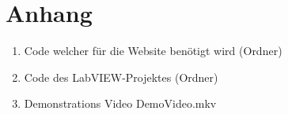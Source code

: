 \documentclass[a4paper,12pt,final]{article} %
\numberwithin{equation}{section} %
\numberwithin{figure}{section} %
\numberwithin{table}{section} %
\begin{document}
\section*{Anhang} 
\begin{enumerate}
	\item Code welcher für die Website benötigt wird (Ordner)
	\item Code des LabVIEW-Projektes (Ordner)
	\item Demonstrations Video DemoVideo.mkv
\end{enumerate}
\newpage
\end{document}
